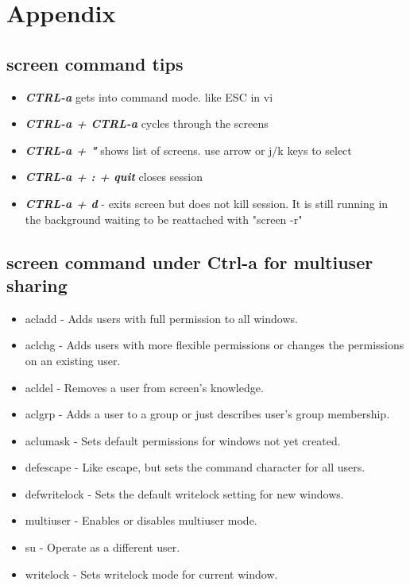 \documentclass[11pt]{article}
\begin{document}
\section{Appendix}
\subsection{screen command tips}
\begin{itemize}
	\item \textbf{\textit{CTRL-a}}   gets into command mode.  like ESC in vi
\item \textbf{\textit{CTRL-a + CTRL-a}}   cycles through the screens
\item \textbf{\textit{CTRL-a + "}} shows list of screens.  use arrow or j/k keys to select
\item \textbf{\textit{CTRL-a + : + quit}} closes session
\item \textbf{\textit{CTRL-a + d}}  - exits screen but does not kill session.  It is still running in the background waiting to be reattached with "screen -r"
\end{itemize}


\subsection{screen command under  Ctrl-a for multiuser sharing}
\begin{itemize}
	\item acladd - Adds users with full permission to all windows.
	\item aclchg - Adds users with more flexible permissions or changes the permissions on an existing user.
	\item acldel - Removes a user from screen's knowledge.
	\item aclgrp - Adds a user to a group or just describes user's group membership.
	\item aclumask - Sets default permissions for windows not yet created.
	\item defescape - Like escape, but sets the command character for all users.
	\item defwritelock - Sets the default writelock setting for new windows.
	\item multiuser - Enables or disables multiuser mode.
	\item su - Operate as a different user.
	\item writelock - Sets writelock mode for current window.

\end{itemize}
\end{document}
